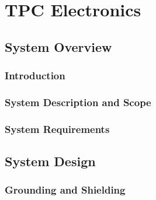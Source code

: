 \chapter{TPC Electronics}
\label{ch:fdsp-tpc-elec}


\section{System Overview}
\label{sec:fdsp-tpc-elec-ov}


\subsection{Introduction}
\label{sec:fdsp-tpc-elec-ov-intro}


\subsection{System Description and Scope}
\label{sec:fdsp-tpc-elec-ov-scope}


\subsection{System Requirements}
\label{sec:fdsp-tpc-elec-ov-req}



\section{System Design}
\label{sec:fdsp-tpc-elec-design}


\subsection{Grounding and Shielding}
\label{sec:fdsp-tpc-elec-design-ground}



